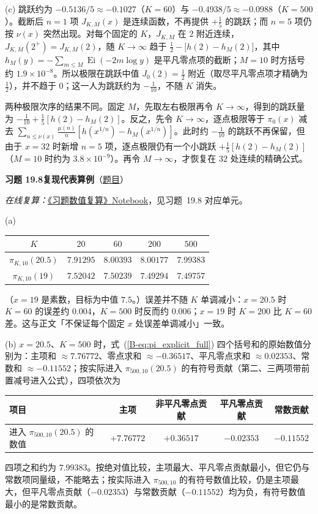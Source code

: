 \documentclass[11pt,a4paper]{article}
\DeclareMathOperator{\Ei}{Ei}
\newcommand{\bref}[1]{\ref*{B-#1}}
\newcommand{\Sol}[2]{%
  \par\addvspace{1.2em}\noindent
  \hypertarget{s:#1}{}\textbf{习题 #1\quad #2}\hfill{\small（\hyperlink{q:#1}{题目}）}\par
  \nopagebreak\smallskip}
\begin{document}
(c) 跳跃约为 $-0.5136/5\approx-0.1027$（$K=60$）与 $-0.4938/5\approx-0.0988$（$K=500$）。截断后 $n=1$ 项 $J_{K,M}(x)$ 是连续函数，不再提供 $+\frac15$ 的跳跃；而 $n=5$ 项仍按 $\nu(x)$ 突然出现。对每个固定的 $K$，$J_{K,M}$ 在 $2$ 附近连续，$J_{K,M}(2^+)=J_{K,M}(2)$，随 $K\to\infty$ 趋于 $\frac12-\bigl[h(2)-h_M(2)\bigr]$，其中 $h_M(y)=-\sum_{m\le M}\Ei(-2m\log y)$ 是平凡零点项的截断；$M=10$ 时方括号约 $1.9\times10^{-8}$。所以极限在跳跃中值 $J_0(2)=\frac12$ 附近（取尽平凡零点项才精确为 $\frac12$），并不趋于 $0$；这一人为跳跃约为 $-\frac1{10}$，不随 $K$ 消失。

两种极限次序的结果不同。固定 $M$，先取左右极限再令 $K\to\infty$，得到的跳跃量为 $-\frac1{10}+\frac15[h(2)-h_M(2)]$。反之，先令 $K\to\infty$，逐点极限等于 $\pi_0(x)$ 减去 $\sum_{n\le\nu(x)}\frac{\mu(n)}n[h(x^{1/n})-h_M(x^{1/n})]$。此时约 $-\frac1{10}$ 的跳跃不再保留，但由于 $x=32$ 时新增 $n=5$ 项，逐点极限仍有一个小跳跃 $+\frac15[h(2)-h_M(2)]$（$M=10$ 时约为 $3.8\times10^{-9}$）。再令 $M\to\infty$，才恢复在 $32$ 处连续的精确公式。

\Sol{19.8}{复现代表算例}
\emph{在线复算：}\href{https://colab.research.google.com/github/lichengtong123/lichengtong-RH/blob/main/\%E4\%B9\%A0\%E9\%A2\%98\%E4\%B8\%8E\%E8\%A7\%A3\%E7\%AD\%94/\%E4\%B9\%A0\%E9\%A2\%98\%E6\%95\%B0\%E5\%80\%BC\%E5\%A4\%8D\%E7\%AE\%97.ipynb}{《习题数值复算》Notebook}，见习题~19.8 对应单元。

(a)
\begin{center}
\small
\begin{tabular}{@{}ccccc@{}}
\toprule
$K$ & $20$ & $60$ & $200$ & $500$ \\
\midrule
$\pi_{K,10}(20.5)$ & $7.91295$ & $8.00393$ & $8.00177$ & $7.99383$ \\
$\pi_{K,10}(19)$ & $7.52042$ & $7.50239$ & $7.49294$ & $7.49757$ \\
\bottomrule
\end{tabular}
\end{center}
（$x=19$ 是素数，目标为中值 $7.5$。）误差并不随 $K$ 单调减小：$x=20.5$ 时 $K=60$ 的误差约 $0.004$，$K=500$ 时反而约 $0.006$；$x=19$ 时 $K=200$ 比 $K=60$ 差。这与正文「不保证每个固定 $x$ 处误差单调减小」一致。

(b) $x=20.5$、$K=500$ 时，式~(\bref{eq:pi_explicit_full}) 四个括号和的原始数值分别为：主项和 $\approx7.76772$、零点求和 $\approx-0.36517$、平凡零点求和 $\approx0.02353$、常数和 $\approx-0.11552$；按实际进入 $\pi_{500,10}(20.5)$ 的有符号贡献（第二、三两项带前置减号进入公式），四项依次为
\begin{center}
\small
\begin{tabular}{@{}lcccc@{}}
\toprule
项目 & 主项 & 非平凡零点贡献 & 平凡零点贡献 & 常数贡献 \\
\midrule
进入 $\pi_{500,10}(20.5)$ 的数值 & $+7.76772$ & $+0.36517$ & $-0.02353$ & $-0.11552$ \\
\bottomrule
\end{tabular}
\end{center}
四项之和约为 $7.99383$。按绝对值比较，主项最大、平凡零点贡献最小，但它仍与常数项同量级，不能略去；按实际进入 $\pi_{500,10}$ 的有符号数值比较，仍是主项最大，但平凡零点贡献（$-0.02353$）与常数贡献（$-0.11552$）均为负，有符号数值最小的是常数贡献。
\end{document}
